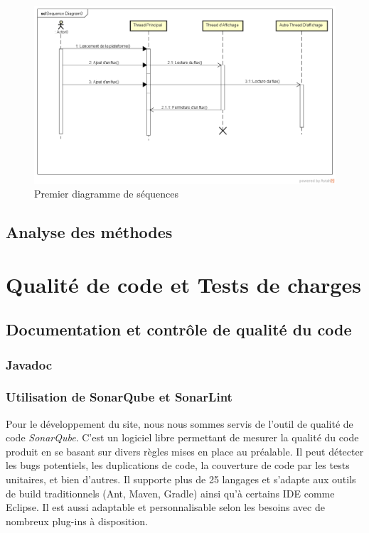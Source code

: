 \documentclass{polytech/polytech}
\begin{document}
\begin{figure}
	\includegraphics[scale=0.25]{images/SequenceDiagram.png}
	\caption{Premier diagramme de séquences}
	\label{fig:seqdiag1}
\end{figure}


\chapter{Analyse des méthodes}



\part{Qualité de code et Tests de charges}


\chapter{Documentation et contrôle de qualité du code}


\section{Javadoc}


\section{Utilisation de SonarQube et SonarLint}

Pour le développement du site, nous nous sommes servis de l'outil de qualité de code \textit{SonarQube}. C'est un logiciel libre permettant de mesurer la qualité du code produit en se basant sur divers règles mises en place au préalable. Il peut détecter les bugs potentiels, les duplications de code, la couverture de code par les tests unitaires, et bien d'autres. Il supporte plus de 25 langages et s'adapte aux outils de build traditionnels (Ant, Maven, Gradle) ainsi qu'à certains IDE comme Eclipse. Il est aussi adaptable et personnalisable selon les besoins avec de nombreux plug-ins à disposition.
\end{document}

